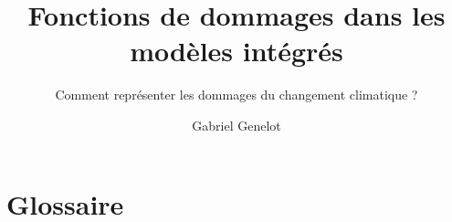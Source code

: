 \documentclass{layout/epfl-report}
\begin{document}





\frontmatter

\title{Fonctions de dommages dans les modèles intégrés}
\subtitle{Comment représenter les dommages du changement climatique ?}
\author{Gabriel Genelot}

\subject{\textit{Mémoire de recherche}} %
\affiliation{} %

\makecover




%

\tableofcontents



%


\mainmatter











\setcounter{biburlnumpenalty}{7000}
\setcounter{biburllcpenalty}{7000}
\setcounter{biburlucpenalty}{7000}




\appendix

\renewcommand{\chaptername}{Annexe}
\newrefsegment


\chapter{Glossaire}
\begin{multicols}{2}
    \printglossary[title=]
\end{multicols}
\end{document}
